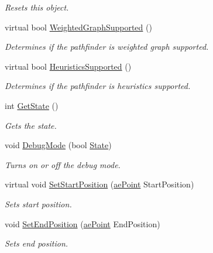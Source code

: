 \begin{DoxyCompactItemize}
\begin{DoxyCompactList}\small\item\em Resets this object. \end{DoxyCompactList}\item 
virtual bool \hyperlink{classae_path_finder_a76dad98c8f1c7b3be8688d549fc2fbaf}{Weighted\+Graph\+Supported} ()
\begin{DoxyCompactList}\small\item\em Determines if the pathfinder is weighted graph supported. \end{DoxyCompactList}\item 
virtual bool \hyperlink{classae_path_finder_a07e505593b1af2c3c35854e8d8b21708}{Heuristics\+Supported} ()
\begin{DoxyCompactList}\small\item\em Determines if the pathfinder is heuristics supported. \end{DoxyCompactList}\item 
int \hyperlink{classae_path_finder_a6f6d0af491e9a4ee7fa59999d2bfe24a}{Get\+State} ()
\begin{DoxyCompactList}\small\item\em Gets the state. \end{DoxyCompactList}\item 
void \hyperlink{classae_path_finder_a14af2094678cc4c41726e7fa3aadcc22}{Debug\+Mode} (bool \hyperlink{_base_class_8h_aded8224779c70fab5084220935d672bba46a2a41cc6e552044816a2d04634545d}{State})
\begin{DoxyCompactList}\small\item\em Turns on or off the debug mode. \end{DoxyCompactList}\item 
virtual void \hyperlink{classae_path_finder_a0acb8baba84dacf01734583b258ed89a}{Set\+Start\+Position} (\hyperlink{structae_core_1_1ae_point}{ae\+Point} Start\+Position)
\begin{DoxyCompactList}\small\item\em Sets start position. \end{DoxyCompactList}\item 
void \hyperlink{classae_path_finder_a40cc0daab301f20f1f297d95452ff416}{Set\+End\+Position} (\hyperlink{structae_core_1_1ae_point}{ae\+Point} End\+Position)
\begin{DoxyCompactList}\small\item\em Sets end position. \end{DoxyCompactList}\item 

\end{DoxyCompactItemize}
